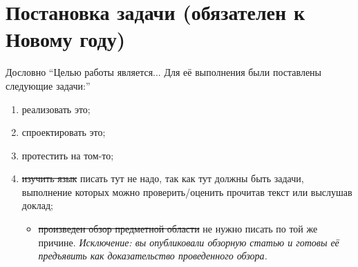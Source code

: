 
\section{Постановка задачи (обязателен к Новому году)}
\label{sec:task}
Дословно \enquote{Целью работы является... Для её выполнения были постав\-лены следующие задачи:}
\begin{enumerate}
	\item  реализовать это;
	\item  спроектировать это;
	\item  протестить на том-то;
	\item \sout{изучить язык \OCaml{}} писать тут не надо, так как тут должны быть задачи, выполнение которых можно проверить/оценить прочитав текст или выслушав доклад;
	      \begin{itemize}
		      \item \sout{произведен обзор предметной области} не нужно писать по той же причине. \emph{Исключение: вы опубликовали обзорную статью и готовы её предъявить как доказательство проведенного обзора.}
	      \end{itemize}
\end{enumerate}
